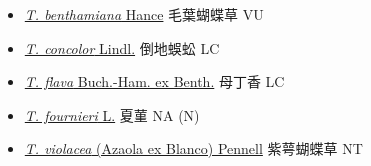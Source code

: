 \begin{itemize}
  \begin{itemize}
        \item[] \href{http://www.theplantlist.org/tpl1.1/search?q=Torenia+benthamiana}{\textit{T. benthamiana} Hance}   毛葉蝴蝶草   VU
        \item[] \href{http://www.theplantlist.org/tpl1.1/search?q=Torenia+concolor}{\textit{T. concolor} Lindl.}   倒地蜈蚣   LC
        \item[] \href{http://www.theplantlist.org/tpl1.1/search?q=Torenia+flava}{\textit{T. flava} Buch.-Ham. ex Benth.}   母丁香   LC
        \item[] \href{http://www.theplantlist.org/tpl1.1/search?q=Torenia+fournieri}{\textit{T. fournieri} L.}   夏菫   NA (N)
        \item[] \href{http://www.theplantlist.org/tpl1.1/search?q=Torenia+violacea}{\textit{T. violacea} (Azaola ex Blanco) Pennell}   紫萼蝴蝶草   NT
  \end{itemize}
  \end{itemize}
